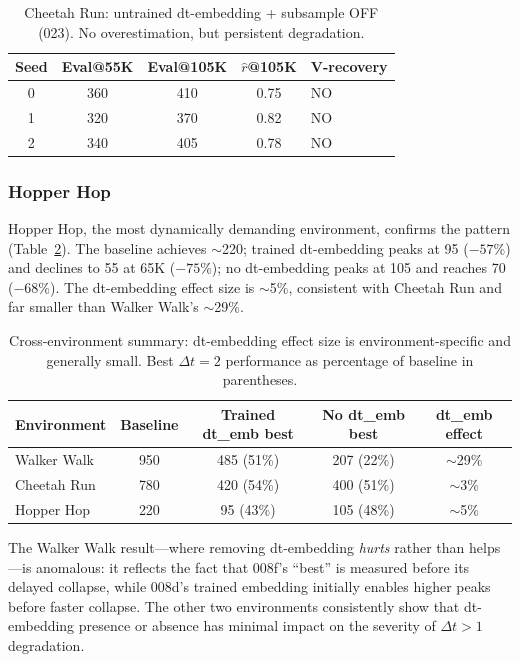 \documentclass[10pt,letterpaper]{article}
\newcommand{\dt}{\Delta t}
\begin{document}
\begin{table}[t]
\centering
\caption{Cheetah Run: untrained dt-embedding + subsample OFF (023). No overestimation, but persistent degradation.}
\label{tab:cheetah_023}
\small
\begin{tabular}{ccccl}
\toprule
Seed & Eval@55K & Eval@105K & $\hat{r}$@105K & V-recovery \\
\midrule
0 & 360 & 410 & 0.75 & NO \\
1 & 320 & 370 & 0.82 & NO \\
2 & 340 & 405 & 0.78 & NO \\
\bottomrule
\end{tabular}
\end{table}

\subsubsection{Hopper Hop}

Hopper Hop, the most dynamically demanding environment, confirms the pattern (Table~\ref{tab:hopper}).
The baseline achieves $\sim$220; trained dt-embedding peaks at 95 ($-57$\%) and declines to 55 at 65K ($-75$\%); no dt-embedding peaks at 105 and reaches 70 ($-68$\%).
The dt-embedding effect size is $\sim$5\%, consistent with Cheetah Run and far smaller than Walker Walk's $\sim$29\%.

\begin{table}[t]
\centering
\caption{Cross-environment summary: dt-embedding effect size is environment-specific and generally small. Best $\dt=2$ performance as percentage of baseline in parentheses.}
\label{tab:hopper}
\small
\begin{tabular}{lcccc}
\toprule
Environment & Baseline & Trained dt\_emb best & No dt\_emb best & dt\_emb effect \\
\midrule
Walker Walk & 950 & 485 (51\%) & 207 (22\%) & $\sim$29\% \\
Cheetah Run & 780 & 420 (54\%) & 400 (51\%) & $\sim$3\% \\
Hopper Hop & 220 & 95 (43\%) & 105 (48\%) & $\sim$5\% \\
\bottomrule
\end{tabular}
\end{table}

The Walker Walk result---where removing dt-embedding \emph{hurts} rather than helps---is anomalous: it reflects the fact that 008f's ``best'' is measured before its delayed collapse, while 008d's trained embedding initially enables higher peaks before faster collapse.
The other two environments consistently show that dt-embedding presence or absence has minimal impact on the severity of $\dt>1$ degradation.
\end{document}
